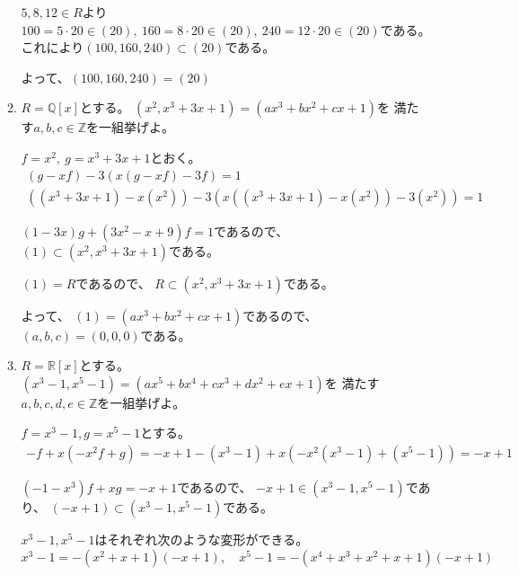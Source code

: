 \documentclass[12pt,b5paper]{ltjsarticle}
\begin{document}
\begin{enumerate}
\begin{enumerate}
            $5,8,12\in R$より
            $100=5\cdot 20\in (20),\ 160=8\cdot20\in (20),\ 240=12\cdot20 \in (20)$である。
            これにより$(100,160,240)\subset (20)$である。

            よって、$(100,160,240)=(20)$

            \hrulefill

       \item
            $R=\mathbb{Q}[x]$とする。
            $(x^2,x^3+3x+1)=(ax^3+bx^2+cx+1)$を
            満たす$a,b,c\in\mathbb{Z}$を一組挙げよ。

            \dotfill

            $f=x^2,\ g=x^3+3x+1$とおく。
            \begin{gather}
             (g-xf)-3(x(g-xf)-3f) = 1\\
             ( (x^3+3x+1) - x (x^2) )
             -3( x( (x^3+3x+1)-x(x^2) )-3(x^2)) = 1
            \end{gather}

            $(1-3x)g +(3x^2-x+9)f = 1$であるので、
            $(1)\subset (x^2,x^3+3x+1)$である。

            $(1)=R$であるので、
            $R\subset (x^2,x^3+3x+1)$である。

            よって、
            $(1)=(ax^3+bx^2+cx+1)$であるので、
            $(a,b,c)=(0,0,0)$である。

            \hrulefill

       \item
            $R=\mathbb{R}[x]$とする。
            $(x^3-1,x^5-1)=(ax^5+bx^4+cx^3+dx^2+ex+1)$を
            満たす$a,b,c,d,e\in\mathbb{Z}$を一組挙げよ。

            \dotfill

            $f=x^3-1,g=x^5-1$とする。
            \begin{gather}
             -f+x(-x^2f+g) = -x+1
            -(x^3-1)+x( -x^2(x^3-1) +  (x^5-1) ) = -x+1
            \end{gather}

            $(-1-x^3)f+xg = -x+1$であるので、
            $-x+1\in (x^3-1,x^5-1)$であり、
            $(-x+1) \subset (x^3-1,x^5-1)$である。

            $x^3-1,x^5-1$はそれぞれ次のような変形ができる。
            \begin{equation}
             x^3-1 = -(x^2+x+1)(-x+1),
              \quad
             x^5-1 = -(x^4+x^3+x^2+x+1)(-x+1)
            \end{equation}


\end{enumerate}
\end{enumerate}
\end{document}
